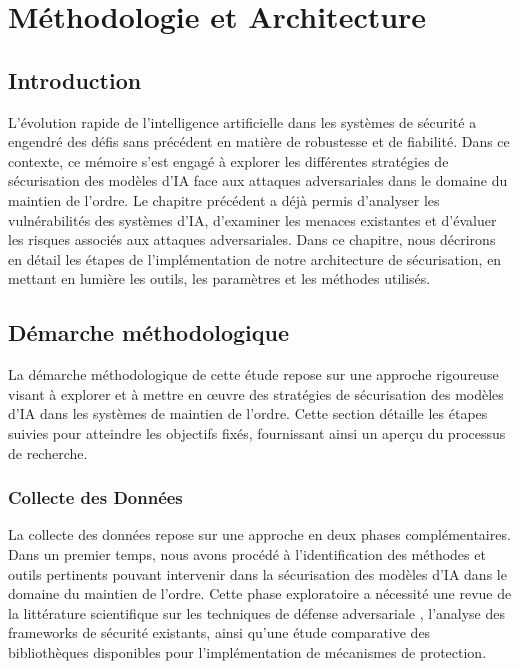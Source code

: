\chapter{Méthodologie et Architecture}

\section*{Introduction}

L'évolution rapide de l'intelligence artificielle dans les systèmes de sécurité a engendré des défis sans précédent en matière de robustesse et de fiabilité. Dans ce contexte, ce mémoire s'est engagé à explorer les différentes stratégies de sécurisation des modèles d'IA face aux attaques adversariales dans le domaine du maintien de l'ordre. Le chapitre précédent a déjà permis d'analyser les vulnérabilités des systèmes d'IA, d'examiner les menaces existantes et d'évaluer les risques associés aux attaques adversariales. Dans ce chapitre, nous décrirons en détail les étapes de l'implémentation de notre architecture de sécurisation, en mettant en lumière les outils, les paramètres et les méthodes utilisés.

\section{Démarche méthodologique}

La démarche méthodologique de cette étude repose sur une approche rigoureuse visant à explorer et à mettre en œuvre des stratégies de sécurisation des modèles d'IA dans les systèmes de maintien de l'ordre. Cette section détaille les étapes suivies pour atteindre les objectifs fixés, fournissant ainsi un aperçu du processus de recherche.

\subsection{Collecte des Données}

La collecte des données repose sur une approche en deux phases complémentaires. Dans un premier temps, nous avons procédé à l'identification des méthodes et outils pertinents pouvant intervenir dans la sécurisation des modèles d'IA dans le domaine du maintien de l'ordre. Cette phase exploratoire a nécessité une revue de la littérature scientifique sur les techniques de défense adversariale \cite{madry2017towards}, l'analyse des frameworks de sécurité existants, ainsi qu'une étude comparative des bibliothèques disponibles pour l'implémentation de mécanismes de protection.


